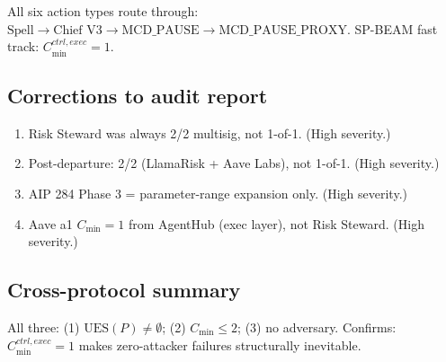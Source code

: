 All six action types route through:
$\text{Spell}\to\text{Chief V3}\to\text{MCD\_PAUSE}\to\text{MCD\_PAUSE\_PROXY}$.
SP-BEAM fast track: $C_{\min}^{ctrl,exec}=1$.

\subsection{Corrections to audit report}

\begin{enumerate}[label=(E\arabic*)]
  \item Risk Steward was always 2/2 multisig, not 1-of-1. (High severity.)
  \item Post-departure: 2/2 (LlamaRisk + Aave Labs), not 1-of-1. (High severity.)
  \item AIP 284 Phase 3 = parameter-range expansion only. (High severity.)
  \item Aave a1 $C_{\min}=1$ from AgentHub (exec layer), not Risk Steward. (High severity.)
\end{enumerate}

\subsection{Cross-protocol summary}

All three: (1) $\mathrm{UES}(P)\neq\emptyset$; (2) $C_{\min}\leq 2$; (3) no adversary.
Confirms: $C_{\min}^{ctrl,exec}=1$ makes zero-attacker failures structurally inevitable.
